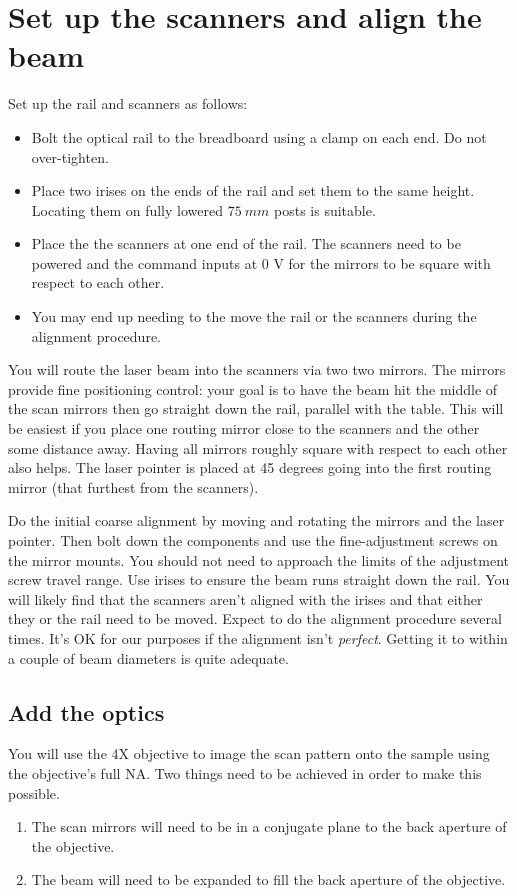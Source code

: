 \documentclass[a4paper]{report}
\begin{document}
\section{Set up the scanners and align the beam}
Set up the rail and scanners as follows:
\begin{itemize}
\setlength\itemsep{0.15em}
\item Bolt the optical rail to the breadboard using a clamp on each end. Do not over-tighten. 
\item Place two irises on the ends of the rail and set them to the same height. 
Locating them on fully lowered $75~mm$ posts is suitable. 
\item Place the the scanners at one end of the rail.
The scanners need to be powered and the command inputs at 0 V for the mirrors to be square with respect to each other. 
\item You may end up needing to the move the rail or the scanners during the alignment procedure.
\end{itemize}

\vspace{1.5em}

You will route the laser beam into the scanners via two two mirrors. 
The mirrors provide fine positioning control: your goal is to have the beam hit the middle of the scan mirrors then go straight down the rail, parallel with the table. 
This will be easiest if you place one routing mirror close to the scanners and the other some distance away. 
Having all mirrors roughly square with respect to each other also helps.
The laser pointer is placed at 45 degrees going into the first routing mirror (that furthest from the scanners). 

Do the initial coarse alignment by moving and rotating the mirrors and the laser pointer. 
Then bolt down the components and use the fine-adjustment screws on the mirror mounts. 
You should not need to approach the limits of the adjustment screw travel range.
Use irises to ensure the beam runs straight down the rail. 
You will likely find that the scanners aren't aligned with the irises and that either they or the rail need to be moved. 
Expect to do the alignment procedure several times. 
It's OK for our purposes if the alignment isn't \textit{perfect}. 
Getting it to within a couple of beam diameters is quite adequate. 

\clearpage
\subsection{Add the optics}
You will use the 4X objective to image the scan pattern onto the sample using the objective's full NA. 
Two things need to be achieved in order to make this possible. 
\begin{enumerate}
\setlength\itemsep{0.1em}
\item The scan mirrors will need to be in a conjugate plane to the back aperture of the objective. 
\item The beam will need to be expanded to fill the back aperture of the objective. 
\end{enumerate}
\end{document}
